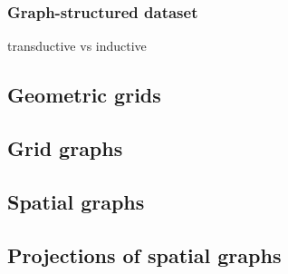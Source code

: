 \documentclass{article}
\theoremstyle{definition}
\begin{document}
\subsubsection{Graph-structured dataset}
\label{transductive_graph}

transductive vs inductive

\subsection{Geometric grids}

\subsection{Grid graphs}

\subsection{Spatial graphs}

\subsection{Projections of spatial graphs}
\end{document}
